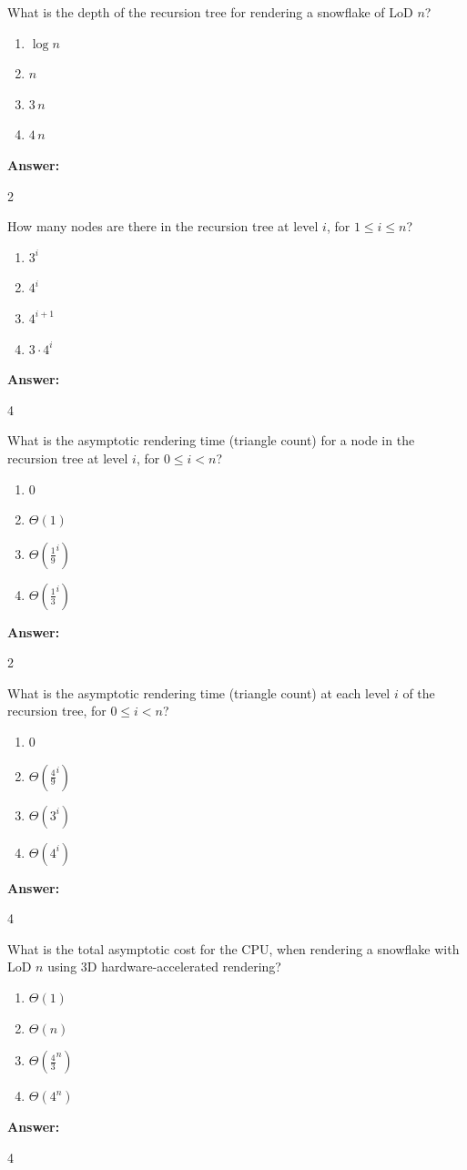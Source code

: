 \documentclass[12pt,twoside]{article}
\newcommand{\answer}{
	\par\medskip
	\textbf{Answer:}
}
\newcommand{\answerIa}{ \answer
	2
}
\newcommand{\answerIb}{ \answer
	4
}
\newcommand{\answerIc}{ \answer
	2
}
\newcommand{\answerId}{ \answer
	4
}
\newcommand{\answerIe}{ \answer
	4
}
\begin{document}
\begin{problems}
	\begin{problemparts}
		\problempart {} What is the depth of the recursion tree for rendering a
		snowflake of LoD $n$?
		\begin{enumerate}
			\item $\log n$
			\item $n$
			\item $3 \, n$
			\item $4 \, n$
		\end{enumerate}
		\answerIa

		\problempart {} How many nodes are there in the recursion tree at level
		$i$, for $1 \le i \le n$?
		\begin{enumerate}
			\item $3 ^ i$
			\item $4 ^ i$
			\item $4 ^ {i + 1}$
			\item $3 \cdot 4 ^ i$
		\end{enumerate}
		\answerIb

		\problempart {} What is the asymptotic rendering time (triangle count) for a
		node in the recursion tree at level $i$, for $0 \le i < n$?
		\begin{enumerate}
			\item $0$
			\item $\Theta(1)$
			\item $\Theta(\frac{1}{9}^i)$
			\item $\Theta(\frac{1}{3}^i)$
		\end{enumerate}
		\answerIc

		\problempart {} What is the asymptotic rendering time (triangle count) at
		each level $i$ of the recursion tree, for $0 \le i < n$?
		\begin{enumerate}
			\item 0
			\item $\Theta(\frac{4}{9} ^ i)$
			\item $\Theta(3 ^ i)$
			\item $\Theta(4 ^ i)$
		\end{enumerate}
		\answerId

		\problempart {} What is the total asymptotic cost for the CPU, when rendering
		a snowflake with LoD $n$ using 3D hardware-accelerated rendering?
		\begin{enumerate}
			\item $\Theta(1)$
			\item $\Theta(n)$
			\item $\Theta(\frac{4}{3}^n)$
			\item $\Theta(4^n)$
		\end{enumerate}
		\answerIe
	\end{problemparts}


\end{problems}
\end{document}
